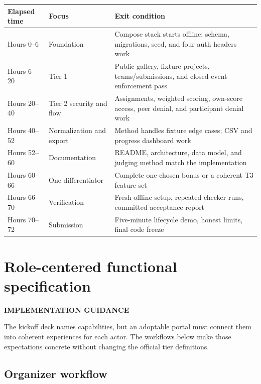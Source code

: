 \documentclass[11pt]{article}
\newcommand{\advisory}{\textcolor{DeepBlue}{\textbf{IMPLEMENTATION GUIDANCE}}}
\begin{document}
\begin{tabularx}{\linewidth}{@{}L{29mm}L{37mm}Y@{}}
\toprule
\textbf{Elapsed time} & \textbf{Focus} & \textbf{Exit condition}\\
\midrule
Hours 0--6 & Foundation & Compose stack starts offline; schema, migrations, seed, and four auth headers work\\
Hours 6--20 & Tier 1 & Public gallery, fixture projects, teams/submissions, and closed-event enforcement pass\\
Hours 20--40 & Tier 2 security and flow & Assignments, weighted scoring, own-score access, peer denial, and participant denial work\\
Hours 40--52 & Normalization and export & Method handles fixture edge cases; CSV and progress dashboard work\\
Hours 52--60 & Documentation & README, architecture, data model, and judging method match the implementation\\
Hours 60--66 & One differentiator & Complete one chosen bonus or a coherent T3 feature set\\
Hours 66--70 & Verification & Fresh offline setup, repeated checker runs, committed acceptance report\\
Hours 70--72 & Submission & Five-minute lifecycle demo, honest limits, final code freeze\\
\bottomrule
\end{tabularx}

\section{Role-centered functional specification}

\advisory\par


The kickoff deck names capabilities, but an adoptable portal must connect them into coherent experiences for each actor. The workflows below make those expectations concrete without changing the official tier definitions.

\subsection{Organizer workflow}
\end{document}
